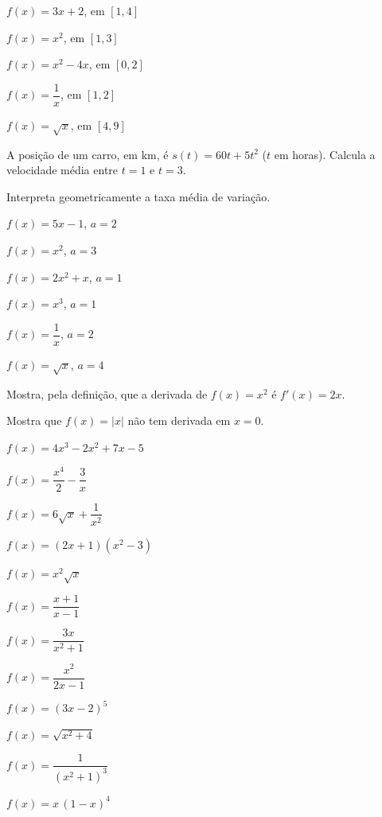\documentclass[12pt]{article}
\begin{document}


\begin{exercicios}
  \item $f(x) = 3x + 2$, \; em $[1, 4]$
  \item $f(x) = x^2$, \; em $[1, 3]$
  \item $f(x) = x^2 - 4x$, \; em $[0, 2]$
  \item $f(x) = \dfrac{1}{x}$, \; em $[1, 2]$
  \item $f(x) = \sqrt{x}$, \; em $[4, 9]$
  \item A posição de um carro, em km, é $s(t) = 60t + 5t^2$ ($t$ em horas). Calcula a velocidade média entre $t = 1$ e $t = 3$.
  \item Interpreta geometricamente a taxa média de variação.
\end{exercicios}

\begin{exercicios}
  \item $f(x) = 5x - 1$, \; $a = 2$
  \item $f(x) = x^2$, \; $a = 3$
  \item $f(x) = 2x^2 + x$, \; $a = 1$
  \item $f(x) = x^3$, \; $a = 1$
  \item $f(x) = \dfrac{1}{x}$, \; $a = 2$
  \item $f(x) = \sqrt{x}$, \; $a = 4$
  \item Mostra, pela definição, que a derivada de $f(x) = x^2$ é $f'(x) = 2x$.
  \item Mostra que $f(x) = |x|$ não tem derivada em $x = 0$.
\end{exercicios}

\begin{exercicios}
  \item $f(x) = 4x^3 - 2x^2 + 7x - 5$
  \item $f(x) = \dfrac{x^4}{2} - \dfrac{3}{x}$
  \item $f(x) = 6\sqrt{x} + \dfrac{1}{x^2}$
  \item $f(x) = (2x + 1)(x^2 - 3)$
  \item $f(x) = x^2\sqrt{x}$
  \item $f(x) = \dfrac{x + 1}{x - 1}$
  \item $f(x) = \dfrac{3x}{x^2 + 1}$
  \item $f(x) = \dfrac{x^2}{2x - 1}$
  \item $f(x) = (3x - 2)^5$
  \item $f(x) = \sqrt{x^2 + 4}$
  \item $f(x) = \dfrac{1}{(x^2 + 1)^3}$
  \item $f(x) = x\,(1 - x)^4$
\end{exercicios}
\end{document}
